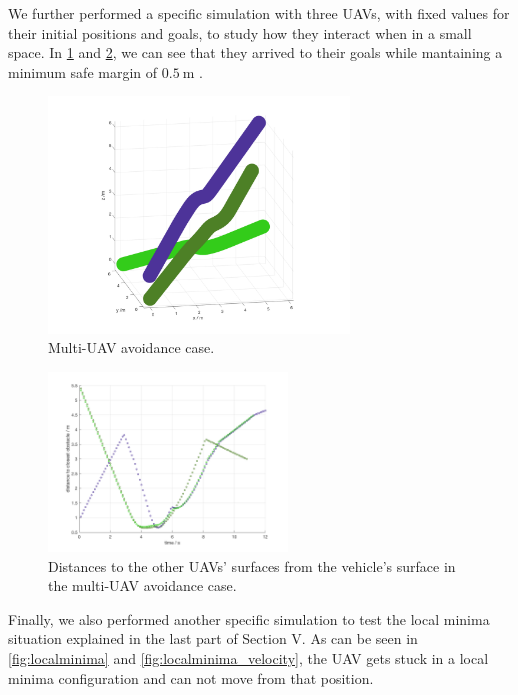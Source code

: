 \documentclass[journal]{IEEEtran}
\begin{document}
		We further performed a specific simulation with three UAVs, with fixed values for their initial positions and goals, to study how they interact when in a small space. In \figurename{ \ref{fig:multi_uav_avoidance}} and \figurename{ \ref{fig:multi_uav_avoidance_distance}}, we can see that they arrived to their goals while mantaining a minimum safe margin of $\SI{0.5}{\meter}$ .\\
		
		\begin{figure}[h]
			\centering
			\includegraphics[width=8cm]{Results/Potentialfields/multi_uav_avoidance}
			\caption{Multi-UAV avoidance case.}
			\label{fig:multi_uav_avoidance}
		\end{figure}
	
		\begin{figure}[h]
			\centering
			\includegraphics[width=2.5in]{Results/Potentialfields/multi_uav_avoidance_obstacle}
			\caption{Distances to the other UAVs' surfaces from the vehicle's surface in the multi-UAV avoidance case.}
			\label{fig:multi_uav_avoidance_distance}
		\end{figure}
	
		Finally, we also performed another specific simulation to test the local minima situation explained in the last part of Section V. As can be seen in \figurename{ \ref{fig:localminima}} and \figurename{ \ref{fig:localminima_velocity}}, the UAV gets stuck in a local minima configuration and can not move from that position. 
		
\end{document}
